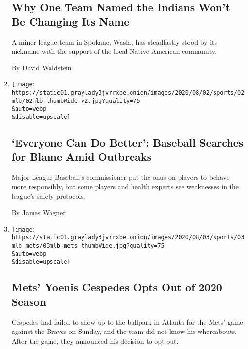 \begin{enumerate}
  \hypertarget{why-one-team-named-the-indians-wont-be-changing-its-name}{%
  \subsection{Why One Team Named the Indians Won't Be Changing Its
  Name}\label{why-one-team-named-the-indians-wont-be-changing-its-name}}

  A minor league team in Spokane, Wash., has steadfastly stood by its
  nickname with the support of the local Native American community.

  By David Waldstein
\item
  \href{/2020/08/02/sports/baseball/mlb-coronavirus-outbreaks.html}{}

  \texttt{[image: https://static01.graylady3jvrrxbe.onion/images/2020/08/02/sports/02mlb/02mlb-thumbWide-v2.jpg?quality=75\\\&auto=webp\\\&disable=upscale]}

  \hypertarget{everyone-can-do-better-baseball-searches-for-blame-amid-outbreaks}{%
  \subsection{`Everyone Can Do Better': Baseball Searches for Blame Amid
  Outbreaks}\label{everyone-can-do-better-baseball-searches-for-blame-amid-outbreaks}}

  Major League Baseball's commissioner put the onus on players to behave
  more responsibly, but some players and health experts see weaknesses
  in the league's safety protocols.

  By James Wagner
\item
  \href{/2020/08/02/sports/baseball/Yoenis-cespedes-opt-out-rule.html}{}

  \texttt{[image: https://static01.graylady3jvrrxbe.onion/images/2020/08/03/sports/03mlb-mets/03mlb-mets-thumbWide.jpg?quality=75\\\&auto=webp\\\&disable=upscale]}

  \hypertarget{mets-yoenis-cespedes-opts-out-of-2020-season}{%
  \subsection{Mets' Yoenis Cespedes Opts Out of 2020
  Season}\label{mets-yoenis-cespedes-opts-out-of-2020-season}}

  Cespedes had failed to show up to the ballpark in Atlanta for the
  Mets' game against the Braves on Sunday, and the team did not know his
  whereabouts. After the game, they announced his decision to opt out.


\end{enumerate}
